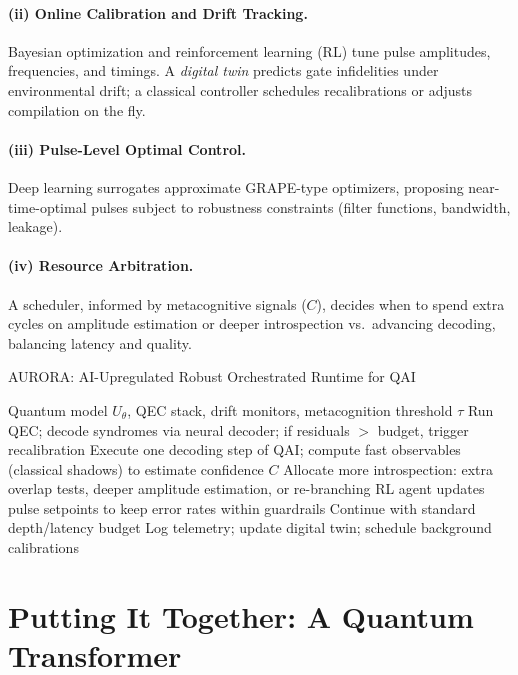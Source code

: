 \documentclass[11pt]{article}
\begin{document}
\paragraph{(ii) Online Calibration and Drift Tracking.}
Bayesian optimization and reinforcement learning (RL) tune pulse amplitudes, frequencies, and timings.
A \emph{digital twin} predicts gate infidelities under environmental drift; a classical controller schedules recalibrations or adjusts compilation on the fly.

\paragraph{(iii) Pulse-Level Optimal Control.}
Deep learning surrogates approximate GRAPE-type optimizers, proposing near-time-optimal pulses subject to robustness constraints (filter functions, bandwidth, leakage).

\paragraph{(iv) Resource Arbitration.}
A scheduler, informed by metacognitive signals ($C$), decides when to spend extra cycles on amplitude estimation or deeper introspection vs.\ advancing decoding, balancing latency and quality.

\begin{algorithm}[t]
\caption{AURORA: AI-Upregulated Robust Orchestrated Runtime for QAI}
\label{alg:aurora}
\begin{algorithmic}[1]
\Require Quantum model $U_\theta$, QEC stack, drift monitors, metacognition threshold $\tau$
  \State Run QEC; decode syndromes via neural decoder; if residuals $>$ budget, trigger recalibration
  \State Execute one decoding step of QAI; compute fast observables (classical shadows) to estimate confidence $C$
     \State Allocate more introspection: extra overlap tests, deeper amplitude estimation, or re-branching
     \State RL agent updates pulse setpoints to keep error rates within guardrails
  \Else
     \State Continue with standard depth/latency budget
  \EndIf
  \State Log telemetry; update digital twin; schedule background calibrations
\EndWhile
\end{algorithmic}
\end{algorithm}

\section{Putting It Together: A Quantum Transformer}
\end{document}
